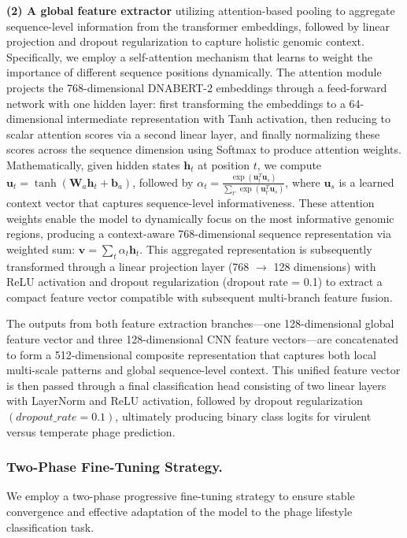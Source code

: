 \documentclass[runningheads]{llncs}
\begin{document}
\textbf{(2) A global feature extractor} utilizing attention-based pooling to aggregate sequence-level information from the transformer embeddings, followed by linear projection and dropout regularization to capture holistic genomic context. Specifically, we employ a self-attention mechanism \cite{lin2017structured} that learns to weight the importance of different sequence positions dynamically. The attention module projects the 768-dimensional DNABERT-2 embeddings through a feed-forward network with one hidden layer: first transforming the embeddings to a 64-dimensional intermediate representation with Tanh activation, then reducing to scalar attention scores via a second linear layer, and finally normalizing these scores across the sequence dimension using Softmax to produce attention weights. Mathematically, given hidden states $\mathbf{h}_t$ at position $t$, we compute $\mathbf{u}_t = \tanh(\mathbf{W}_a \mathbf{h}_t + \mathbf{b}_a)$, followed by $\alpha_t = \frac{\exp(\mathbf{u}_t^T \mathbf{u}_s)}{\sum_{t'} \exp(\mathbf{u}_{t'}^T \mathbf{u}_s)}$, where $\mathbf{u}_s$ is a learned context vector that captures sequence-level informativeness. These attention weights enable the model to dynamically focus on the most informative genomic regions, producing a context-aware 768-dimensional sequence representation via weighted sum: $\mathbf{v} = \sum_t \alpha_t \mathbf{h}_t$. This aggregated representation is subsequently transformed through a linear projection layer (768 $\rightarrow$ 128 dimensions) with ReLU activation and dropout regularization (dropout rate = 0.1) to extract a compact feature vector compatible with subsequent multi-branch feature fusion. 

The outputs from both feature extraction branches—one 128-dimensional global feature vector and three 128-dimensional CNN feature vectors—are concatenated to form a 512-dimensional composite representation that captures both local multi-scale patterns and global sequence-level context. This unified feature vector is then passed through a final classification head consisting of two linear layers with LayerNorm and ReLU activation, followed by dropout regularization $(dropout\_rate = 0.1)$, ultimately producing binary class logits for virulent versus temperate phage prediction.

\subsubsection{Two-Phase Fine-Tuning Strategy.}

We employ a two-phase progressive fine-tuning strategy to ensure stable convergence and effective adaptation of the model to the phage lifestyle classification task.
\end{document}
